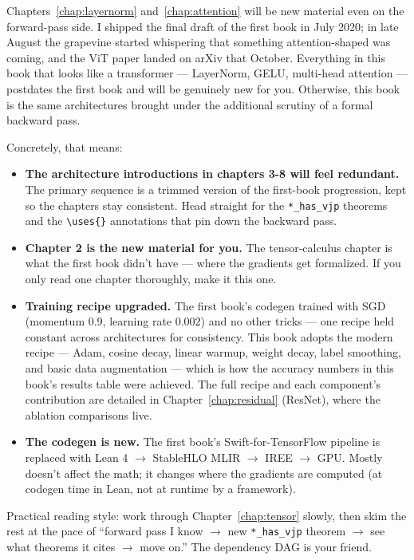 Chapters~\ref{chap:layernorm} and~\ref{chap:attention} will be new
material even on the forward-pass side. I shipped the final draft
of the first book in July 2020; in late August the grapevine started
whispering that something attention-shaped was coming, and the ViT
paper landed on arXiv that October. Everything in this book that
looks like a transformer --- LayerNorm, GELU, multi-head attention
--- postdates the first book and will be genuinely new for you. Otherwise,
this book is the same architectures brought under the additional
scrutiny of a formal backward pass.

Concretely, that means:

\begin{itemize}
\item \textbf{The architecture introductions in chapters 3-8 will
  feel redundant.} The primary sequence is a trimmed version of the
  first-book progression, kept so the chapters stay consistent.
  Head straight for the \texttt{*\_has\_vjp} theorems and the
  \texttt{\textbackslash uses\{\}} annotations that pin down the
  backward pass.

\item \textbf{Chapter 2 is the new material for you.} The
  tensor-calculus chapter is what the first book didn't have --- where the
  gradients get formalized. If you only read one chapter thoroughly,
  make it this one.

\item \textbf{Training recipe upgraded.} The first book's codegen
  trained with SGD (momentum 0.9, learning rate 0.002) and no other
  tricks --- one recipe held constant across architectures for
  consistency. This book adopts the modern recipe --- Adam, cosine
  decay, linear warmup, weight decay, label smoothing, and basic
  data augmentation --- which is
  how the accuracy numbers in this book's results table were
  achieved. The full recipe and each component's contribution are
  detailed in Chapter~\ref{chap:residual} (ResNet), where the
  ablation comparisons live.

\item \textbf{The codegen is new.} The first book's Swift-for-TensorFlow
  pipeline is replaced with Lean 4 \(\to\) StableHLO MLIR \(\to\) IREE
  \(\to\) GPU. Mostly doesn't affect the math; it changes where the
  gradients are computed (at codegen time in Lean, not at runtime
  by a framework).
\end{itemize}

Practical reading style: work through Chapter~\ref{chap:tensor}
slowly, then skim the rest at the pace of ``forward pass I know
\(\to\) new \texttt{*\_has\_vjp} theorem \(\to\) see what theorems it
cites \(\to\) move on.'' The dependency DAG is your friend.

